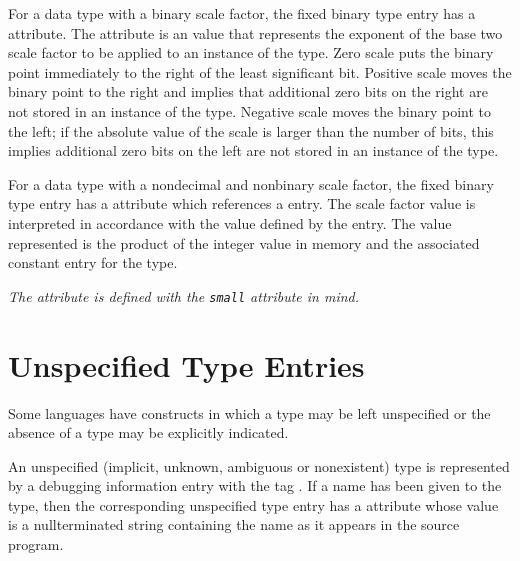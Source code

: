 \hypertarget{chap:DWATbinaryscalebinaryscalefactorforfixedpointtype}{}
For a data type with a binary scale factor, the fixed
binary type entry has a 
\DWATbinaryscale{} attribute. 
The
\DWATbinaryscale{} attribute 
is an  value
that represents the exponent of the base two scale factor to
be applied to an instance of the type.  Zero scale puts the
binary point immediately to the right of the least significant
bit. Positive scale moves the binary point to the right and
implies that additional zero bits on the right are not stored
in an instance of the type. Negative scale moves the binary
point to the left; if the absolute value of the scale is
larger than the number of bits, this implies additional zero
bits on the left are not stored in an instance of the type.

For 
\hypertarget{chap:DWATsmallscalefactorforfixedpointtype}{}
a data type with a non\dash decimal and non\dash binary scale factor,
the fixed binary type entry has a 
\DWATsmall{} attribute which
references a 
\DWTAGconstant{} entry. The scale factor value
is interpreted in accordance with the value defined by the
\DWTAGconstant{} entry. The value represented is the product
of the integer value in memory and the associated constant
entry for the type.

\textit{The \DWATsmall{} attribute 
is defined with the  \texttt{small}
attribute in mind.}

\section{Unspecified Type Entries}
\label{chap:unspecifiedtypeentries}
Some languages have constructs in which a type 
may be left unspecified or the absence of a type
may be explicitly indicated.

An unspecified (implicit, unknown, ambiguous or nonexistent)
type is represented by a debugging information entry with
the tag \DWTAGunspecifiedtypeTARG. 
If a name has been given
to the type, then the corresponding unspecified type entry
has a \DWATname{} attribute 
whose value is
a null\dash terminated
string containing the name as it appears in the source program.

